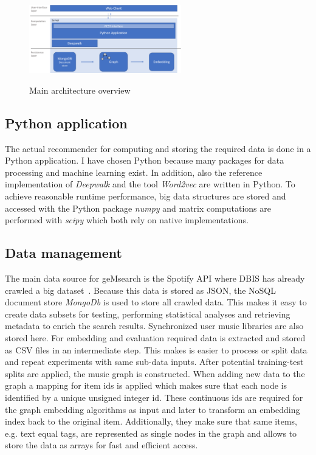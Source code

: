 \documentclass[sigconf]{acmart}
\begin{document}
\begin{figure}[ht]
	{\includegraphics[width=250px]{architecture.png}}	
	\caption{Main architecture overview}
	\label{fig:architecture}
\end{figure}

\subsection{Python application}
The actual recommender for computing and storing the required data is done in a Python application. I have chosen Python because many packages for data processing and machine learning exist. In addition, also the reference implementation of \emph{Deepwalk} and the tool \emph{Word2vec} are written in Python. To achieve reasonable runtime performance, big data structures are stored and accessed with the Python package \emph{numpy} and matrix computations are performed with \emph{scipy} which both rely on native implementations.


\subsection{Data management}
The main data source for geMsearch is the Spotify API where DBIS has already crawled a big dataset~\cite{pichl2017improving}. Because this data is stored as JSON, the NoSQL document store \emph{MongoDb} is used to store all crawled data. This makes it easy to create data subsets for testing, performing statistical analyses and retrieving metadata to enrich the search results. Synchronized user music libraries are also stored here.
For embedding and evaluation required data is extracted and stored as CSV files in an intermediate step. This makes is easier to process or split data and repeat experiments with same sub-data inputs. After potential training-test splits are applied, the music graph is constructed. When adding new data to the graph a mapping for item ids is applied which makes sure that each node is identified by a unique unsigned integer id. These  continuous ids are required for the graph embedding algorithms as input and later to transform an embedding index back to the original item. Additionally, they make sure that same items, e.g. text equal tags, are represented as single nodes in the graph and allows to store the data as arrays for fast and efficient access. \\
\end{document}
